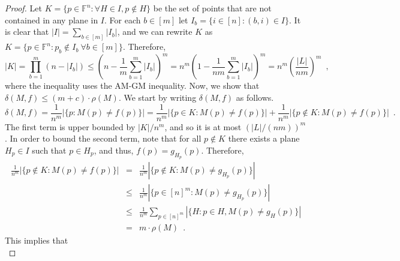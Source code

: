 \documentclass[11pt]{article}
\numberwithin{equation}{section}
\theoremstyle{definition}
\theoremstyle{plain}
\theoremstyle{plain}
\newcommand{\colored}{}
\newcommand{\reldist}{\colored{\delta}}
\newcommand{\robust}{\colored{\rho}} %
\newcommand{\plane}{{\colored{H}}} %
\newcommand{\blocklength}{\colored{n}} %
\newcommand{\testerinput}{\colored{M}} %
\newcommand{\closestlocalword}[1]{ \colored{g_{#1}}} %
\newcommand{\closestglobalword}{\colored{f}} %
\newcommand{\Field}{\colored{\mathbb F}}
\newcommand\abs[1]{\colored{\left|#1\right|}}
\begin{document}
\begin{proof}
Let $K = \{p \in \Field^{\blocklength} : \forall \plane \in I, p \notin \plane\}$ be the set of points that are not contained in any plane in $I$.
For each $b \in [m]$ let $I_b = \{i \in [\blocklength] : (b,i) \in I\}$.
It is clear that $\abs{I} = \sum_{b \in [m]} \abs{I_b}$,
and we can rewrite $K$ as $K = \{p \in \Field^{\blocklength} : p_b \notin I_b \ \forall b \in [m]\}$.
Therefore,
\begin{equation*}
\abs{K} = \prod_{b = 1}^m (\blocklength - \abs{I_b}) \leq \left(\blocklength - \frac{1}{m} \sum_{b = 1}^m \abs{I_b} \right)^m = \blocklength^m \left(1 - \frac{1}{\blocklength m} \sum_{b = 1}^m \abs{I_b} \right)^m = \blocklength^m \left(\frac{\abs{L}}{\blocklength m}\right)^m \enspace,
\end{equation*}
where the inequality uses the AM-GM inequality.
Now, we show that $\reldist(\testerinput,f) \leq (m+c)\cdot \robust(\testerinput)$.
We start by writing $\reldist(\testerinput,\closestglobalword)$ as follows.
\begin{equation*}
  \reldist(\testerinput,\closestglobalword)
    = \frac{1}{\blocklength^m}  \abs{ \{p : \testerinput(p) \neq \closestglobalword(p) \}}
    = \frac{1}{\blocklength^m}  \abs{ \{p \in K : \testerinput(p) \neq \closestglobalword(p) \}}
        + \frac{1}{\blocklength^m}  \abs{ \{p \notin K: \testerinput(p) \neq \closestglobalword(p) \}} \enspace.
\end{equation*}
The first term is upper bounded by ${\abs{K}}/{\blocklength^m}$, and so it is at most $\left({\abs{L}}/{(\blocklength m)}\right)^m$.
In order to bound the second term, note that for all $p \notin K$ there exists a plane $\plane_p \in I$ such that $p \in H_p$,
and thus, $\closestglobalword(p) = \closestlocalword{\plane_p}(p)$. Therefore,
\begin{eqnarray*}
  \frac{1}{\blocklength^m}  \abs{ \{p \notin K: \testerinput(p) \neq \closestglobalword(p) \}}
  & = & \frac{1}{\blocklength^m}  \abs{ \{p \notin K: \testerinput(p) \neq \closestlocalword{\plane_p}(p) \}} \\
  & \leq & \frac{1}{\blocklength^m}  \abs{ \{p \in [\blocklength]^m: \testerinput(p) \neq \closestlocalword{\plane_p}(p) \}} \\
  & \leq & \frac{1}{\blocklength^m}  \sum_{p \in [\blocklength]^m} \abs{\{ \plane : p \in H, \testerinput(p) \neq \closestlocalword{\plane}(p) \}} \\
  & = & m \cdot \robust(\testerinput) \enspace.
\end{eqnarray*}
This implies that
\begin{equation*}

\end{equation*}
\end{proof}
\end{document}
